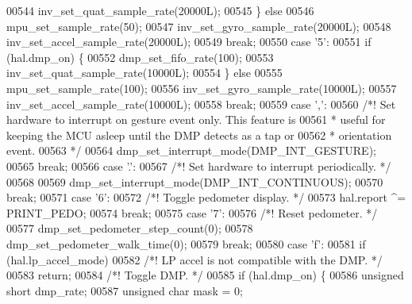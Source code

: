 \begin{DoxyCode}
{{{{{{{{00544             inv\_set\_quat\_sample\_rate(20000L);
00545         \} \textcolor{keywordflow}{else}
00546             mpu\_set\_sample\_rate(50);
00547         inv\_set\_gyro\_sample\_rate(20000L);
00548         inv\_set\_accel\_sample\_rate(20000L);
00549         \textcolor{keywordflow}{break};
00550     \textcolor{keywordflow}{case} \textcolor{stringliteral}{'5'}:
00551         \textcolor{keywordflow}{if} (hal.dmp_on) \{
00552             dmp\_set\_fifo\_rate(100);
00553             inv\_set\_quat\_sample\_rate(10000L);
00554         \} \textcolor{keywordflow}{else}
00555             mpu\_set\_sample\_rate(100);
00556         inv\_set\_gyro\_sample\_rate(10000L);
00557         inv\_set\_accel\_sample\_rate(10000L);
00558         \textcolor{keywordflow}{break};
00559     \textcolor{keywordflow}{case} \textcolor{stringliteral}{','}:
00560         \textcolor{comment}{/*! Set hardware to interrupt on gesture event only. This feature is}
00561 \textcolor{comment}{         * useful for keeping the MCU asleep until the DMP detects as a tap or}
00562 \textcolor{comment}{         * orientation event.}
00563 \textcolor{comment}{         */}
00564         dmp\_set\_interrupt\_mode(DMP\_INT\_GESTURE);
00565         \textcolor{keywordflow}{break};
00566     \textcolor{keywordflow}{case} \textcolor{stringliteral}{'.'}:
00567         \textcolor{comment}{/*! Set hardware to interrupt periodically. */}
00568 
00569         dmp\_set\_interrupt\_mode(DMP\_INT\_CONTINUOUS);
00570         \textcolor{keywordflow}{break};
00571     \textcolor{keywordflow}{case} \textcolor{stringliteral}{'6'}:
00572         \textcolor{comment}{/*! Toggle pedometer display. */}
00573         hal.report ^= PRINT_PEDO;
00574         \textcolor{keywordflow}{break};
00575     \textcolor{keywordflow}{case} \textcolor{stringliteral}{'7'}:
00576         \textcolor{comment}{/*! Reset pedometer. */}
00577         dmp\_set\_pedometer\_step\_count(0);
00578         dmp\_set\_pedometer\_walk\_time(0);
00579         \textcolor{keywordflow}{break};
00580     \textcolor{keywordflow}{case} \textcolor{stringliteral}{'f'}:
00581         \textcolor{keywordflow}{if} (hal.lp_accel_mode)
00582             \textcolor{comment}{/*! LP accel is not compatible with the DMP. */}
00583             \textcolor{keywordflow}{return};
00584         \textcolor{comment}{/*! Toggle DMP. */}
00585         \textcolor{keywordflow}{if} (hal.dmp_on) \{
00586             \textcolor{keywordtype}{unsigned} \textcolor{keywordtype}{short} dmp\_rate;
00587             \textcolor{keywordtype}{unsigned} \textcolor{keywordtype}{char} mask = 0;
}}}}}}}}
\end{DoxyCode}
